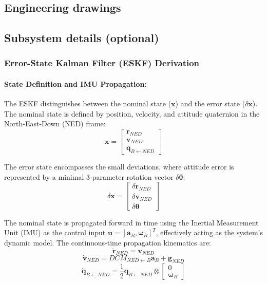 \documentclass[11pt, a4paper]{article} %
\begin{document}
\subsection{Engineering drawings}

\subsection{Subsystem details (optional)}

\subsubsection{Error-State Kalman Filter (ESKF) Derivation}

\paragraph{State Definition and IMU Propagation:}
The ESKF distinguishes between the nominal state ($\mathbf{x}$) and the error state ($\delta\mathbf{x}$). The nominal state is defined by position, velocity, and attitude quaternion in the North-East-Down (NED) frame:
\[
\mathbf{x} = \begin{bmatrix} \mathbf{r}_{NED} \\ \mathbf{v}_{NED} \\ \mathbf{q}_{B \leftarrow NED} \end{bmatrix}
\]

The error state encompasses the small deviations, where attitude error is represented by a minimal 3-parameter rotation vector $\delta\boldsymbol{\theta}$:
\[
\delta\mathbf{x} = \begin{bmatrix} \delta\mathbf{r}_{NED} \\ \delta\mathbf{v}_{NED} \\ \delta\boldsymbol{\theta} \end{bmatrix}
\]

The nominal state is propagated forward in time using the Inertial Measurement Unit (IMU) as the control input $\mathbf{u} = [\mathbf{a}_B, \boldsymbol{\omega}_B]^T$, effectively acting as the system's dynamic model. The continuous-time propagation kinematics are:
\[
\dot{\mathbf{r}}_{NED} = \mathbf{v}_{NED}
\]
\[
\dot{\mathbf{v}}_{NED} = DCM_{NED \leftarrow B} \mathbf{a}_B + \mathbf{g}_{NED}
\]
\[
\dot{\mathbf{q}}_{B \leftarrow NED} = \frac{1}{2} \mathbf{q}_{B \leftarrow NED} \otimes \begin{bmatrix} 0 \\ \boldsymbol{\omega}_B \end{bmatrix}
\]
\end{document}
